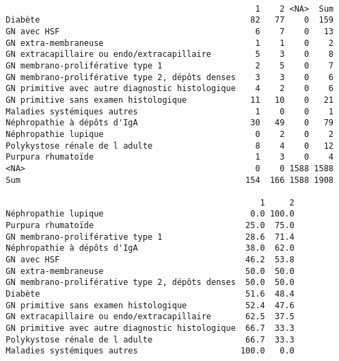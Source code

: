 \documentclass[11pt,a4paper]{article}\usepackage[]{graphicx}\usepackage[]{color}
\makeatletter
\newenvironment{kframe}{%
 \def\at@end@of@kframe{}%
 \ifinner\ifhmode%
  \def\at@end@of@kframe{\end{minipage}}%
  \begin{minipage}{\columnwidth}%
 \fi\fi%
 \def\FrameCommand##1{\hskip\@totalleftmargin \hskip-\fboxsep
 \colorbox{shadecolor}{##1}\hskip-\fboxsep
     \hskip-\linewidth \hskip-\@totalleftmargin \hskip\columnwidth}%
 \MakeFramed {\advance\hsize-\width
   \@totalleftmargin\z@ \linewidth\hsize
   \@setminipage}}%
 {\par\unskip\endMakeFramed%
 \at@end@of@kframe}
\newenvironment{knitrout}{}{} %
\makeatother
\begin{document}
\begin{knitrout}
\color{fgcolor}\begin{kframe}
\begin{verbatim}
                                                 
                                                     1    2 <NA>  Sum
  Diabète                                           82   77    0  159
  GN avec HSF                                        6    7    0   13
  GN extra-membraneuse                               1    1    0    2
  GN extracapillaire ou endo/extracapillaire         5    3    0    8
  GN membrano-proliférative type 1                   2    5    0    7
  GN membrano-proliférative type 2, dépôts denses    3    3    0    6
  GN primitive avec autre diagnostic histologique    4    2    0    6
  GN primitive sans examen histologique             11   10    0   21
  Maladies systémiques autres                        1    0    0    1
  Néphropathie à dépôts d'IgA                       30   49    0   79
  Néphropathie lupique                               0    2    0    2
  Polykystose rénale de l adulte                     8    4    0   12
  Purpura rhumatoïde                                 1    3    0    4
  <NA>                                               0    0 1588 1588
  Sum                                              154  166 1588 1908
                                                 
                                                      1     2
  Néphropathie lupique                              0.0 100.0
  Purpura rhumatoïde                               25.0  75.0
  GN membrano-proliférative type 1                 28.6  71.4
  Néphropathie à dépôts d'IgA                      38.0  62.0
  GN avec HSF                                      46.2  53.8
  GN extra-membraneuse                             50.0  50.0
  GN membrano-proliférative type 2, dépôts denses  50.0  50.0
  Diabète                                          51.6  48.4
  GN primitive sans examen histologique            52.4  47.6
  GN extracapillaire ou endo/extracapillaire       62.5  37.5
  GN primitive avec autre diagnostic histologique  66.7  33.3
  Polykystose rénale de l adulte                   66.7  33.3
  Maladies systémiques autres                     100.0   0.0
\end{verbatim}
\end{kframe}
\end{knitrout}
~\\
\end{document}
